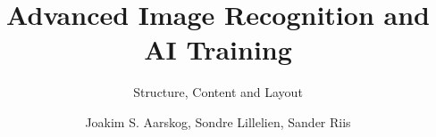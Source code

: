 \documentclass[
]{thesistemplate}
\affiliation{Østfold University College}
\title{Advanced Image Recognition and AI Training} %
\subtitle{Structure, Content and Layout}
\author{
    Joakim S. Aarskog,\+
    Sondre Lillelien,\+
    Sander Riis
}
\begin{document}
\maketitle          %
\makehalftitle      %
\frontmatter        %





\tableofcontents    %

\listoffigures      %

\mainmatter  %










\printglossaries            %

\appendix                   %
\end{document}
